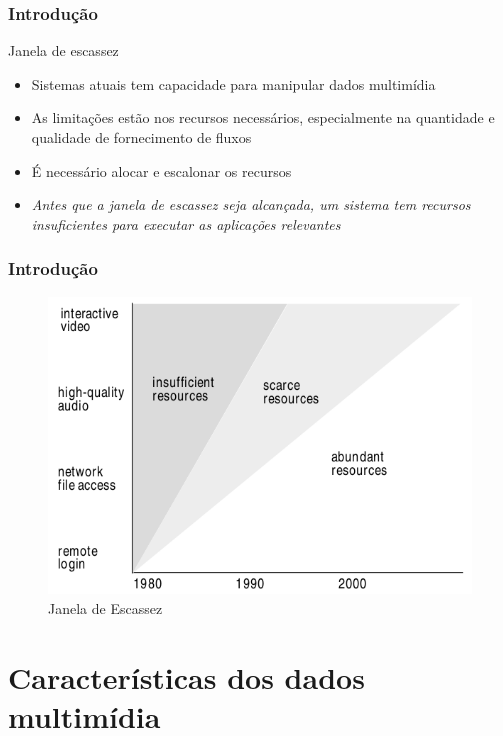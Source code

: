 \documentclass[]{beamer}
\begin{document}
\begin{frame}
  \frametitle{Introdução}
Janela de escassez
\begin{itemize}
  \item Sistemas atuais tem capacidade para manipular dados multimídia
  \item As limitações estão nos recursos necessários, especialmente 
na quantidade e qualidade de fornecimento de fluxos
  \item É necessário alocar e escalonar os recursos
  \item \emph{Antes que a janela de escassez seja alcançada, 
um sistema tem recursos insuficientes para executar as aplicações relevantes}
\end{itemize}
\end{frame}

\begin{frame}
  \frametitle{Introdução}
  \begin{figure}[hbtp]
   \caption{Janela de Escassez}
   \begin{center}
    \includegraphics[scale=0.33]{janela_escassez.png}
   \end{center}
  \end{figure}
\end{frame}

\section{Características dos dados multimídia}
\end{document}

